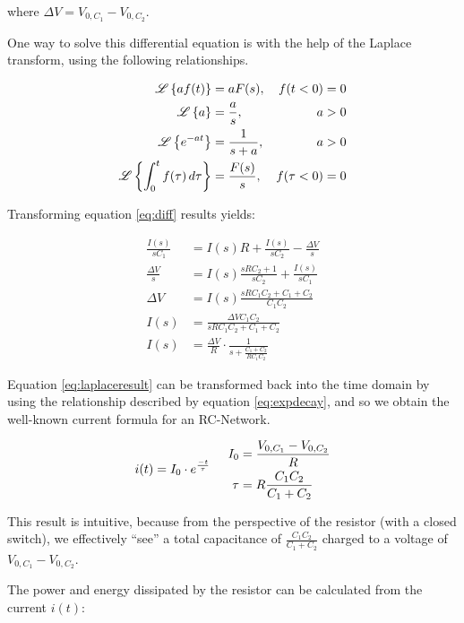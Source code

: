 where $\Delta V = V_{0,C_1} - V_{0,C_2}$.

One way to solve this  differential  equation  is with the help of the Laplace
transform, using the following relationships.

\begin{align}
    \mathscr{L}\left\{af(t)\right\} &= aF(s), & f(t<0)=0 \\
    \mathscr{L}\left\{a\right\} &= \frac{a}{s}, & a > 0 \\
    \mathscr{L}\left\{e^{-at}\right\} &= \frac{1}{s+a}, & a > 0 \label{eq:expdecay} \\
    \mathscr{L}\left\{\int_0^t f(\tau)\,d\tau\right\} &= \frac{F(s)}{s}, & f(\tau<0)=0
\end{align}

Transforming equation \ref{eq:diff} results yields:

\begin{align}
    \frac{I(s)}{sC_1} &= I(s)R + \frac{I(s)}{sC_2} - \frac{\Delta V}{s}\\
    \frac{\Delta V}{s} &= I(s)\frac{sRC_2 + 1}{sC_2} + \frac{I(s)}{sC_1} \\
    \Delta V &= I(s)\frac{sRC_1C_2 + C_1 + C_2}{C_1C_2} \\
    I(s) &= \frac{\Delta V C_1 C_2}{sRC_1C_2 + C_1 + C_2} \\
    I(s) &= \frac{\Delta V}{R}\cdot\frac{1}{s + \frac{C_1 + C_2}{RC_1C_2}} \label{eq:laplaceresult}
\end{align}

Equation \ref{eq:laplaceresult} can  be  transformed back into the time domain
by using the relationship described by  equation  \ref{eq:expdecay}, and so we
obtain the well-known current formula for an RC-Network.

\begin{equation}
    i(t) = I_0 \cdot e^{\frac{-t}{\tau}} \hspace{5mm} \begin{aligned}
        I_0  &= \frac{V_{0,C_1}-V_{0,C_2}}{R} \\
        \tau &= R \frac{C_1C_2}{C_1+C_2}
    \end{aligned}
    \label{eq:currentresult}
\end{equation}

This result is intuitive, because from the perspective of the resistor (with a
closed   switch),   we   effectively   ``see''   a   total    capacitance   of
$\frac{C_1C_2}{C_1+C_2}$  charged  to  a voltage of $V_{0,C_1}  -  V_{0,C_2}$.

The power and  energy  dissipated  by  the resistor can be calculated from the
current $i(t)$:

